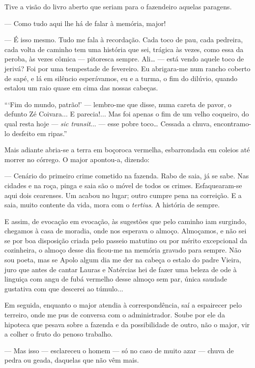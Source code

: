 Tive a visão do livro aberto que seriam para o fazendeiro aquelas
paragens.

--- Como tudo aqui lhe há de falar à memória, major!

--- É isso mesmo. Tudo me fala à recordação. Cada toco de pau, cada
pedreira, cada volta de caminho tem uma história que sei, trágica às
vezes, como essa da peroba, às vezes cômica --- pitoresca sempre.
Ali\ldots{} --- está vendo aquele toco de jerivá? Foi por uma tempestade
de fevereiro. Eu abrigara-me num rancho coberto de sapé, e lá em
silêncio esperávamos, eu e a turma, o fim do dilúvio, quando estalou um
raio quase em cima das nossas cabeças.

```Fim do mundo, patrão!' --- lembro-me que disse, numa careta de pavor,
o defunto Zé Coivara... E parecia!... Mas foi apenas o fim de um velho
coqueiro, do qual resta hoje --- \emph{sic transit}... --- esse pobre
toco\ldots{} Cessada a chuva, encontramo-lo desfeito em ripas.''

Mais adiante abria-se a terra em boçoroca vermelha, esbarrondada em
coleios até morrer no córrego. O major apontou-a, dizendo:

--- Cenário do primeiro crime cometido na fazenda. Rabo de saia, já se
sabe. Nas cidades e na roça, pinga e saia são o móvel de todos os
crimes. Esfaquearam-se aqui dois cearenses. Um acabou no lugar; outro
cumpre pena na correição. E a saia, muito contente da vida, mora com o
\emph{tertius}. A história de sempre.

E assim, de evocação em evocação, às sugestões que pelo caminho iam
surgindo, chegamos à casa de moradia, onde nos esperava o almoço.
Almoçamos, e não sei se por boa disposição criada pelo passeio matutino
ou por mérito excepcional da cozinheira, o almoço desse dia ficou-me na
memória gravado para sempre. Não sou poeta, mas se Apolo algum dia me
der na cabeça o estalo do padre Vieira, juro que antes de cantar Lauras
e Natércias hei de fazer uma beleza de ode à linguiça com angu de fubá
vermelho desse almoço sem par, única saudade gustativa com que descerei
ao túmulo...

Em seguida, enquanto o major atendia à correspondência, saí a espairecer
pelo terreiro, onde me pus de conversa com o administrador. Soube por
ele da hipoteca que pesava sobre a fazenda e da possibilidade de outro,
não o major, vir a colher o fruto do penoso trabalho.

--- Mas isso --- esclareceu o homem --- só no caso de muito azar ---
chuva de pedra ou geada, daquelas que não vêm mais.

